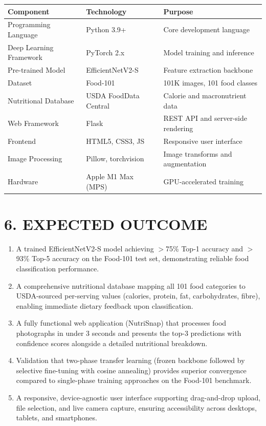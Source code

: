 \documentclass[12pt,a4paper]{article}
\begin{document}
\begin{tabularx}{\textwidth}{l l X}
\toprule
\textbf{Component} & \textbf{Technology} & \textbf{Purpose} \\
\midrule
Programming Language & Python 3.9+ & Core development language \\
\rowcolor{gray!10}
Deep Learning Framework & PyTorch 2.x & Model training and inference \\
Pre-trained Model & EfficientNetV2-S & Feature extraction backbone \\
\rowcolor{gray!10}
Dataset & Food-101 & 101K images, 101 food classes \\
Nutritional Database & USDA FoodData Central & Calorie and macronutrient data \\
\rowcolor{gray!10}
Web Framework & Flask & REST API and server-side rendering \\
Frontend & HTML5, CSS3, JS & Responsive user interface \\
\rowcolor{gray!10}
Image Processing & Pillow, torchvision & Image transforms and augmentation \\
Hardware & Apple M1 Max (MPS) & GPU-accelerated training \\
\bottomrule
\end{tabularx}


\newpage
\section{6. EXPECTED OUTCOME}

\begin{enumerate}[leftmargin=1.5cm]
\item A trained EfficientNetV2-S model achieving $>$75\% Top-1 accuracy and $>$93\% Top-5 accuracy on the Food-101 test set, demonstrating reliable food classification performance.

\item A comprehensive nutritional database mapping all 101 food categories to USDA-sourced per-serving values (calories, protein, fat, carbohydrates, fibre), enabling immediate dietary feedback upon classification.

\item A fully functional web application (NutriSnap) that processes food photographs in under 3 seconds and presents the top-3 predictions with confidence scores alongside a detailed nutritional breakdown.

\item Validation that two-phase transfer learning (frozen backbone followed by selective fine-tuning with cosine annealing) provides superior convergence compared to single-phase training approaches on the Food-101 benchmark.

\item A responsive, device-agnostic user interface supporting drag-and-drop upload, file selection, and live camera capture, ensuring accessibility across desktops, tablets, and smartphones.
\end{enumerate}
\end{document}

